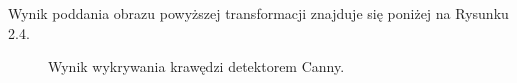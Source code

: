 \documentclass[eng,oneside]{mgr}
\begin{document}
\par Wynik poddania obrazu powyższej transformacji znajduje się poniżej na Rysunku 2.4.
\begin{figure}[htbp]
\centering
{}
\quad
{}
\caption{Wynik wykrywania krawędzi detektorem Canny.}
\end{figure}
\end{document}
